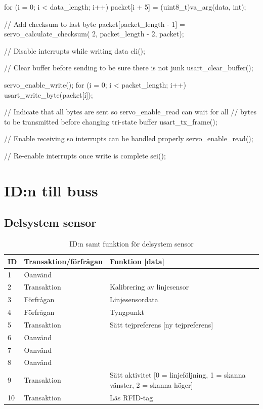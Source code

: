 \begin{listing}{1}
{	for (i = 0; i < data_length; i++) {
		packet[i + 5] = (uint8_t)va_arg(data, int);
	}

	// Add checksum to last byte
	packet[packet_length - 1] = servo_calculate_checksum(
		2, packet_length - 2, packet);

	// Disable interrupts while writing data
	cli();

	// Clear buffer before sending to be sure there is not junk
	usart_clear_buffer();

	servo_enable_write();
	for (i = 0; i < packet_length; i++) {
		usart_write_byte(packet[i]);
	}

	// Indicate that all bytes are sent so servo_enable_read can
	wait for all
	// bytes to be transmitted before changing tri-state buffer
	usart_tx_frame();

	// Enable receiving so interrupts can be handled properly
	servo_enable_read();

	// Re-enable interrupts once write is complete
	sei();
}
\end{listing}

\section{ID:n till buss}
\label{callbacks}
\subsection{Delsystem sensor}

\begin{table}[H]
\centering
\label{callbacks-sensor}
\begin{tabularx}{\textwidth}{|l|l|X|}
\hline
\textbf{ID} & \textbf{Transaktion/förfrågan} & \textbf{Funktion [data]} \\ \hline
1 & Oanvänd & \\ \hline
2 & Transaktion & Kalibrering av linjesensor \\ \hline
3 & Förfrågan & Linjesensordata \\ \hline
4 & Förfrågan & Tyngpunkt \\ \hline
5 & Transaktion & Sätt tejpreferens [ny tejpreferens] \\ \hline
6 & Oanvänd & \\ \hline
7 & Oanvänd & \\ \hline
8 & Oanvänd & \\ \hline
9 & Transaktion & Sätt aktivitet [0 = linjeföljning, 1 = skanna vänster, 2 = skanna höger] \\ \hline
10 & Transaktion & Läs RFID-tag \\ \hline
\end{tabularx}
\caption{ID:n samt funktion för delsystem sensor}
\end{table}

